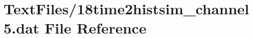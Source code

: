 \hypertarget{18time2histsim__channel5_8dat}{}\section{Text\+Files/18time2histsim\+\_\+channel5.dat File Reference}
\label{18time2histsim__channel5_8dat}
